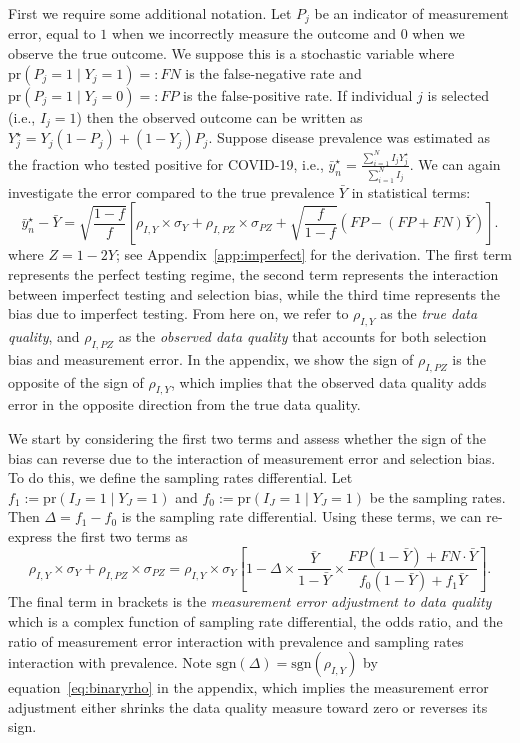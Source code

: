 \documentclass[aoas]{amsart}
\def\pr{\text{pr}}
\def\sgn{\text{sgn}}
\begin{document}
First we require some additional notation.  Let $P_j$ be an indicator of measurement error, equal to $1$ when we incorrectly measure the outcome and $0$ when we observe the true outcome. We suppose this is a stochastic variable where $\pr(P_j = 1 \mid Y_j = 1) =: FN$ is the false-negative rate and $\pr(P_j = 1 \mid Y_j = 0) =: FP$ is the false-positive rate.  If individual $j$ is selected (i.e., $I_j = 1$) then the observed outcome can be written as $Y_j^{\star} = Y_j(1-P_j) + (1-Y_j) P_j$.  Suppose disease prevalence was estimated as the fraction who tested positive for COVID-19, i.e., $\bar y_n^\star = \frac{\sum_{i=1}^N I_j Y_j^\star}{\sum_{i=1}^N I_j}$.  We can again investigate the error compared to the true prevalence $\bar Y$ in statistical terms:
$$
\bar y_n^\star - \bar Y = \sqrt{\frac{1-f}{f}} \left[ \rho_{I,Y} \times \sigma_Y + \rho_{I,PZ} \times \sigma_{PZ} + \sqrt{\frac{f}{1-f}}  \left( FP - (FP+FN) \bar Y \right) \right] .
$$
where $Z = 1-2Y$; see Appendix~\ref{app:imperfect} for the derivation. The first term represents the perfect testing regime, the second term represents the interaction between imperfect testing and selection bias, while the third time represents the bias due to imperfect testing.  From here on, we refer to $\rho_{I,Y}$ as the \emph{true data quality}, and $\rho_{I,PZ}$ as the \emph{observed data quality} that accounts for both selection bias and measurement error.  In the appendix, we show the sign of $\rho_{I,PZ}$ is the opposite of the sign of $\rho_{I,Y}$, which implies that the observed data quality adds error in the opposite direction from the true data quality.

We start by considering the first two terms and assess whether the sign of the bias can reverse due to the interaction of measurement error and selection bias.  To do this, we define the sampling rates differential.  Let $f_1 := \pr (I_J = 1 \mid Y_J = 1)$ and $f_0 := \pr(I_J = 1 \mid Y_J = 1)$ be the sampling rates.  Then $\Delta = f_1 - f_0$ is the sampling rate differential.  Using these terms, we can re-express the first two terms as
$$
\rho_{I,Y} \times \sigma_Y + \rho_{I,PZ} \times \sigma_{PZ} =
\rho_{I,Y} \times \sigma_Y \left[ 1 - \Delta \times \frac{\bar Y}{1-\bar Y} \times \frac{FP(1-\bar Y) + FN \cdot \bar Y}{f_0 (1-\bar Y) + f_1 \bar Y} \right].
$$
The final term in brackets is the \emph{measurement error adjustment to data quality} which is a complex function of sampling rate differential, the odds ratio, and the ratio of measurement error interaction with prevalence and sampling rates interaction with prevalence. Note $\sgn(\Delta) = \sgn(\rho_{I,Y})$ by equation~\ref{eq:binaryrho} in the appendix, which implies the measurement error adjustment either shrinks the data quality measure toward zero or reverses its sign.
\end{document}
